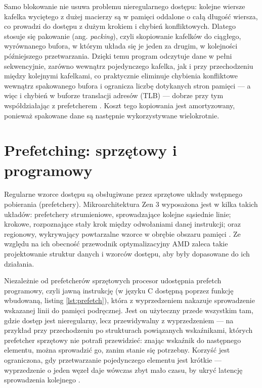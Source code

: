 \documentclass[a4paper,12pt]{book} %
\begin{document}
Samo blokowanie nie usuwa problemu nieregularnego dostępu: kolejne wiersze kafelka wyciętego z dużej macierzy są w pamięci oddalone o całą długość wiersza, co prowadzi do dostępu z dużym krokiem i chybień konfliktowych. Dlatego stosuje się pakowanie (ang. \emph{packing}), czyli skopiowanie kafelków do ciągłego, wyrównanego bufora, w którym układa się je jeden za drugim, w kolejności późniejszego przetwarzania. Dzięki temu program odczytuje dane w pełni sekwencyjnie, zarówno wewnątrz pojedynczego kafelka, jak i przy przechodzeniu między kolejnymi kafelkami, co praktycznie eliminuje chybienia konfliktowe wewnątrz spakowanego bufora i ogranicza liczbę dotykanych stron pamięci --- a więc i chybień w buforze translacji adresów (TLB) --- dobrze przy tym współdziałając z prefetcherem \cite{goto2008anatomy}. Koszt tego kopiowania jest amortyzowany, ponieważ spakowane dane są następnie wykorzystywane wielokrotnie.
\section{Prefetching: sprzętowy i programowy}
\label{sec:prefetching}

Regularne wzorce dostępu są obsługiwane przez sprzętowe układy wstępnego pobierania (prefetchery). Mikroarchitektura Zen 3 wyposażona jest w kilka takich układów: prefetchery strumieniowe, sprowadzające kolejne sąsiednie linie; krokowe, rozpoznające stały krok między odwołaniami danej instrukcji; oraz regionowy, wykrywający powtarzalne wzorce w obrębie obszaru pamięci \cite{amd_sog_19h}. Ze względu na ich obecność przewodnik optymalizacyjny AMD zaleca takie projektowanie struktur danych i wzorców dostępu, aby były dopasowane do ich działania.

Niezależnie od prefetcherów sprzętowych procesor udostępnia prefetch programowy, czyli jawną instrukcję (w języku C dostępną poprzez funkcję wbudowaną, listing \ref{lst:prefetch}), która z wyprzedzeniem nakazuje sprowadzenie wskazanej linii do pamięci podręcznej. Jest on użyteczny przede wszystkim tam, gdzie dostęp jest nieregularny, lecz przewidywalny z wyprzedzeniem --- na przykład przy przechodzeniu po strukturach powiązanych wskaźnikami, których prefetcher sprzętowy nie potrafi przewidzieć: znając wskaźnik do następnego elementu, można sprowadzić go, zanim stanie się potrzebny. Korzyść jest ograniczona, gdy przetwarzanie pojedynczego elementu jest krótkie --- wyprzedzenie o jeden węzeł daje wówczas zbyt mało czasu, by ukryć latencję sprowadzenia kolejnego \cite{drepper2007memory}.
\end{document}
